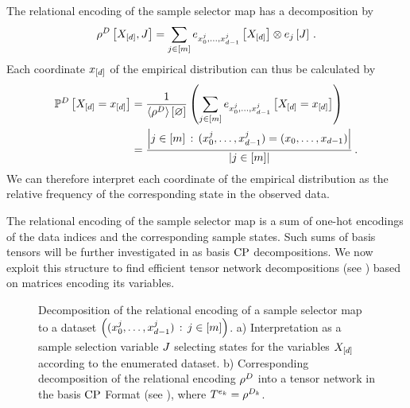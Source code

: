 The relational encoding of the sample selector map has a decomposition by
\begin{align*}
    \rho^{D}\left[X_{[d]},J\right]
    = \sum_{j\in[m]} e_{{x_{0}^{j},\ldots,x_{d-1}^{j}}}\left[X_{[d]}\right] \otimes e_{j}\left[J\right] \, .
\end{align*}
Each coordinate $x_{[d]}$ of the empirical distribution can thus be calculated by
\begin{align*}
    \mathbb{P}^{D}\left[X_{[d]}=x_{[d]}\right]
    & = \frac{1}{\left\langle \rho^{D}\right\rangle \left[ \varnothing \right]} \left( \sum_{j\in[m]} e_{{x_{0}^{j},\ldots,x_{d-1}^{j}}}\left[X_{[d]}=x_{[d]}\right]  \right) \\
    &= \frac{\left|j\in[m] \, : \, ({x_{0}^{j},\ldots,x_{d-1}^{j}}) = (x_{0},\ldots,x_{d-1})\right|}{\left|j\in[m]\right|} \, .
\end{align*}
We can therefore interpret each coordinate of the empirical distribution as the relative frequency of the corresponding state in the observed data.

The relational encoding of the sample selector map is a sum of one-hot encodings of the data indices and the corresponding sample states.
Such sums of basis tensors will be further investigated in  as basis $\mathrm{CP}$ decompositions.
We now exploit this structure to find efficient tensor network decompositions (see ) based on matrices encoding its variables.


\begin{figure}[t!]
    \begin{center}
        
    \end{center}
    \caption{
        Decomposition of the relational encoding of a sample selector map to a dataset $\left(({x_{0}^{j},\ldots,x_{d-1}^{j}})\,:\,j\in[m]\right)$.
        a) Interpretation as a sample selection variable $J$ selecting states for the variables $X_{[d]}$ according to the enumerated dataset.
        b) Corresponding decomposition of the relational encoding $\rho^{D}$ into a tensor network in the basis $\mathrm{CP}$ Format (see ), where $T^{e_{k}}=\rho^{D_{k}}$.
    }
    \label{fig:DataDecomposition}
\end{figure}


